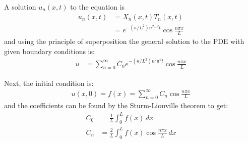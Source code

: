 A solution $u_n(x,t)$ to the equation is
%
\begin{align*}
u_n(x,t) & = X_n(x,t) T_n(x,t) \\
& = e^{-(\kappa/L^2) n^2 \pi^2 t} \cos \frac{n \pi x}{L}
\end{align*}
and using the principle of superposition the general solution to the PDE with given boundary conditions is:
%
\begin{align*}
u & = \sum_{n=0}^{\infty} C_n e^{-(\kappa/L^2) n^2 \pi^2 t} \cos \frac{n \pi x}{L}
\end{align*}

Next, the initial condition is:
%
\begin{align*}
u(x,0) = f(x) = \sum_{n=0}^{\infty} C_n \cos \frac{n \pi x}{L}
\end{align*}
and the coefficients can be found by the Sturm-Liouville theorem to get:
%
\begin{align*}
C_0 & = \frac{1}{L} \int_0^L f(x) \, dx \\
C_n & = \frac{2}{L} \int_0^L f(x) \cos \frac{ n \pi x}{L} \, dx
\end{align*}


